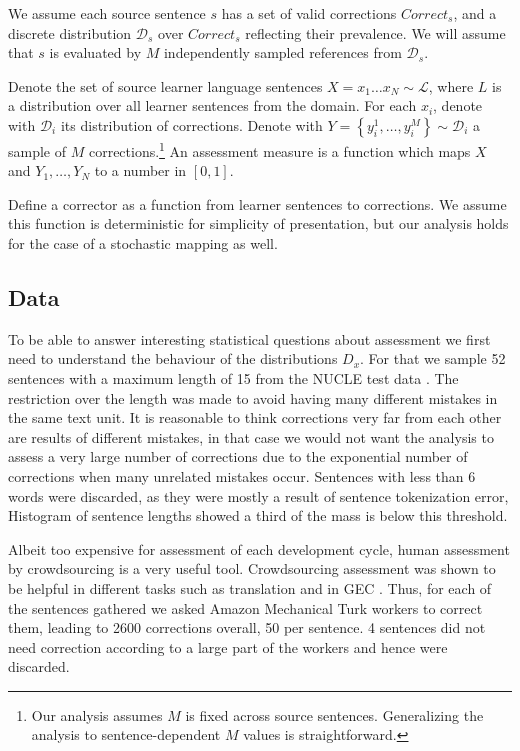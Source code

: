 \documentclass[letter,11pt]{article}
\begin{document}
We assume each source sentence $s$ has a set of valid corrections $Correct_s$,
and a discrete distribution $\mathcal{D}_s$ over $Correct_s$ reflecting their prevalence.
We will assume that $s$ is evaluated by
$M$ independently sampled references from $\mathcal{D}_s$.

Denote the set of source learner language sentences $X=x_{1}\ldots x_N \sim \mathcal{L}$, where
$L$ is a distribution over all learner sentences from the domain. For each $x_i$, denote
with $\mathcal{D}_{i}$ its distribution of corrections.
Denote with $Y = \left\{y_{i}^{1},\ldots, y_{i}^{M}\right\} \sim \mathcal{D}_{i}$
a sample of $M$ corrections.\footnote{Our analysis assumes $M$ is fixed across source sentences.
  Generalizing the analysis to sentence-dependent $M$ values is straightforward.}
An assessment measure is a function which maps $X$ and $Y_1,\ldots,Y_N$ to
a number in $[0,1]$.

Define a corrector as a function from learner sentences to corrections.
We assume this function is deterministic for simplicity of presentation,
but our analysis holds for the case of a stochastic mapping as well.


\subsection{Data}

To be able to answer interesting statistical questions about assessment we first
need to understand the behaviour of the distributions $D_x$. For that we sample
52 sentences with a maximum length of 15 from the NUCLE test data
. The restriction over the length was made to avoid having many different mistakes in the same text unit. It is reasonable to think corrections very far from each other are results of different mistakes, in that case we would not want the analysis to assess a very large number of corrections due to the exponential number of corrections when many unrelated mistakes occur.
Sentences with less than 6 words were discarded, as they were mostly a result of sentence tokenization error,
Histogram of sentence lengths showed a third of the mass is below this threshold.

Albeit too expensive for assessment of each development cycle, human assessment
by crowdsourcing is a very useful tool. Crowdsourcing assessment was shown to
be helpful in different tasks such as translation
\cite{zaidan2011crowdsourcing,post2012constructing}
and in GEC \cite{madnani2011they}. %
Thus, for each of the sentences gathered we asked Amazon Mechanical Turk workers to correct them, leading to 2600 corrections overall,
50 per sentence. 4 sentences did not need correction according to a large part of the workers and hence were discarded.
\end{document}
